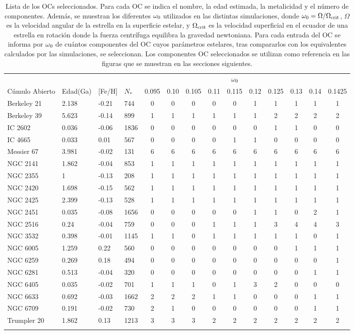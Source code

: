 \begin{longtable}[c]{|l l l l || c c c c c c c c c c|}
	\hline
	& & & & & & & & $\omega_{\mathrm{0}}$ & & & & & \\
	Cúmulo Abierto & Edad(Ga) & [Fe/H] & $N_*$ & 0.095 & 0.10 & 0.105 & 0.11 & 0.115 & 0.12 & 0.125 & 0.13 & 0.14 & 0.1425\\
	\hline
	Berkeley 21 & 2.138 & -0.21 & 744 & 0 & 0 & 0 & 0 & 0 & 1 & 1 & 1 & 1 & 1\\
	Berkeley 39 & 5.623 & -0.14 & 899 & 1 & 1 & 1 & 1 & 1 & 1 & 2 & 2 & 2 & 2\\
	IC 2602 & 0.036 & -0.06 & 1836 & 0 & 0 & 0 & 0 & 0 & 0 & 1 & 1 & 0 & 0\\
	IC 4665 & 0.033 & 0.01 & 567 & 0 & 0 & 0 & 0 & 1 & 1 & 0 & 0 & 0 & 0\\
	Messier 67 & 3.981 & -0.02 & 131 & 6 & 6 & 6 & 6 & 6 & 6 & 6 & 6 & 6 & 6\\
	NGC 2141 & 1.862 & -0.04 & 853 & 1 & 1 & 1 & 1 & 1 & 1 & 1 & 1 & 1 & 1\\
	NGC 2355 & 1 & -0.13 & 208 & 1 & 1 & 1 & 1 & 1 & 1 & 1 & 1 & 1 & 1\\
	NGC 2420 & 1.698 & -0.15 & 562 & 1 & 1 & 1 & 1 & 1 & 1 & 1 & 1 & 1 & 1\\
	NGC 2425 & 2.399 & -0.13 & 528 & 1 & 1 & 1 & 1 & 1 & 1 & 1 & 1 & 1 & 1\\
	NGC 2451 & 0.035 & -0.08 & 1656 & 0 & 0 & 0 & 0 & 0 & 1 & 1 & 0 & 2 & 1\\
	NGC 2516 & 0.24 & -0.04 & 759 & 0 & 0 & 0 & 1 & 1 & 1 & 3 & 4 & 4 & 3\\
	NGC 3532 & 0.398 & -0.01 & 1145 & 1 & 1 & 0 & 1 & 1 & 1 & 1 & 1 & 0 & 1\\
	NGC 6005 & 1.259 & 0.22 & 560 & 0 & 0 & 0 & 0 & 0 & 0 & 0 & 1 & 1 & 1\\
	NGC 6259 & 0.269 & 0.18 & 494 & 0 & 0 & 0 & 0 & 0 & 0 & 0 & 0 & 0 & 1\\
	NGC 6281 & 0.513 & -0.04 & 320 & 0 & 0 & 0 & 0 & 0 & 0 & 0 & 0 & 1 & 1\\
	NGC 6405 & 0.035 & -0.02 & 701 & 1 & 1 & 1 & 0 & 1 & 3 & 2 & 0 & 0 & 0\\
	NGC 6633 & 0.692 & -0.03 & 1662 & 2 & 2 & 2 & 1 & 1 & 0 & 0 & 0 & 1 & 1\\
	NGC 6709 & 0.191 & -0.02 & 730 & 2 & 1 & 0 & 0 & 0 & 0 & 0 & 0 & 1 & 1\\
	Trumpler 20 & 1.862 & 0.13 & 1213 & 3 & 3 & 3 & 2 & 2 & 2 & 2 & 2 & 2 & 2\\
	\hline
	\caption{Lista de los OCs seleccionados. Para cada OC se indica el nombre, la edad estimada, la metalicidad y el número de componentes. Además, se muestran los diferentes $\omega_{\mathrm{0}}$ utilizados en las distintas simulaciones, donde $\omega_{\mathrm{0}} = \Omega / \Omega_{\mathrm{crit}}$, $\Omega$ es la velocidad angular de la estrella en la superficie estelar, y $\Omega_{\mathrm{crit}}$ es la velocidad superficial en el ecuador de una estrella en rotación donde la fuerza centrífuga equilibra la gravedad newtoniana. Para cada entrada del OC se informa por $\omega_{\mathrm{0}}$ de cuántos componentes del OC cuyos parámetros estelares, tras compararlos con los equivalentes calculados por las simulaciones, se seleccionan. Los componentes OC seleccionados se utilizan como referencia en las figuras que se muestran en las secciones siguientes.}

\end{longtable}

